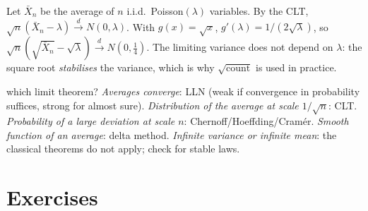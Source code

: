 \begin{example}
Let $\bar X_n$ be the average of $n$ i.i.d.\ Poisson$(\lambda)$ variables. By the CLT,
$\sqrt n(\bar X_n-\lambda)\xrightarrow{d}N(0,\lambda)$. With $g(x)=\sqrt x$,
$g'(\lambda)=1/(2\sqrt\lambda)$, so
$\sqrt n(\sqrt{\bar X_n}-\sqrt\lambda)\xrightarrow{d}N(0,\tfrac14)$. The limiting variance
does not depend on $\lambda$: the square root \emph{stabilises} the variance, which is
why $\sqrt{\text{count}}$ is used in practice.
\end{example}

\begin{interview}{which limit theorem?}
\emph{Averages converge}: LLN (weak if convergence in probability suffices, strong for
almost sure). \emph{Distribution of the average at scale $1/\sqrt n$}: CLT.
\emph{Probability of a large deviation at scale $n$}: Chernoff/Hoeffding/Cram\'er.
\emph{Smooth function of an average}: delta method. \emph{Infinite variance or
infinite mean}: the classical theorems do not apply; check for stable laws.
\end{interview}

\section*{Exercises}

